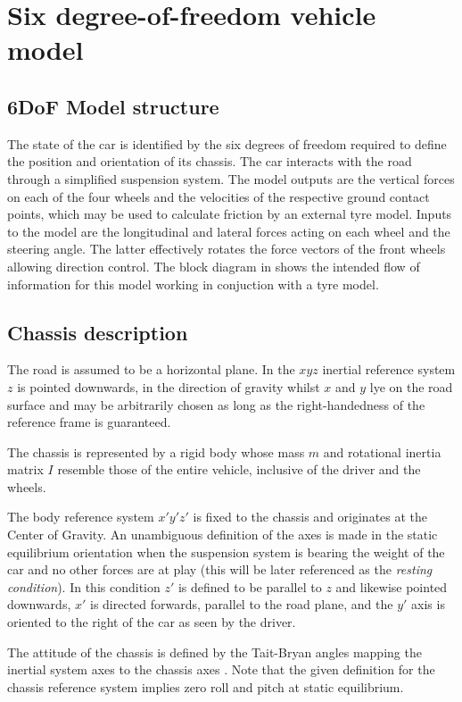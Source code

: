 \chapter{Six degree-of-freedom vehicle model}
\label{chap:6dof}
\section{6DoF Model structure}
\label{sec:6dofconcept}
The state of the car is identified by the six degrees of freedom required to define the position and orientation of its chassis. The car interacts with the road through a simplified suspension system.
The model outputs are the vertical forces on each of the four wheels and the velocities of the respective ground contact points, which may be used to calculate friction by an external tyre model.
Inputs to the model are the longitudinal and lateral forces acting on each wheel and the steering angle. The latter effectively rotates the force vectors of the front wheels allowing direction control.
The block diagram in  shows the intended flow of information for this model working in conjuction with a tyre model.
\section{Chassis description}
\label{sec:body}
The road is assumed to be a horizontal plane. In the $xyz$ inertial reference system $z$ is pointed downwards, in the direction of gravity whilst $x$ and $y$ lye on the road surface and may be arbitrarily chosen as long as the right-handedness of the reference frame is guaranteed.

The chassis is represented by a rigid body whose mass $m$ and rotational inertia matrix $I$ resemble those of the entire vehicle, inclusive of the driver and the wheels.

The body reference system $x'y'z'$ is fixed to the chassis and originates at the Center of Gravity. An unambiguous definition of the axes is made in the static equilibrium orientation when the suspension system is bearing the weight of the car and no other forces are at play (this will be later referenced as the \textit{resting condition}). In this condition $z'$ is defined to be parallel to $z$ and likewise pointed downwards, $x'$ is directed forwards, parallel to the road plane, and the $y'$ axis is oriented to the right of the car as seen by the driver.

The attitude of the chassis is defined by the Tait-Bryan angles mapping the inertial system axes to the chassis axes 
. Note that the given definition for the chassis reference system implies zero roll and pitch at static equilibrium.


